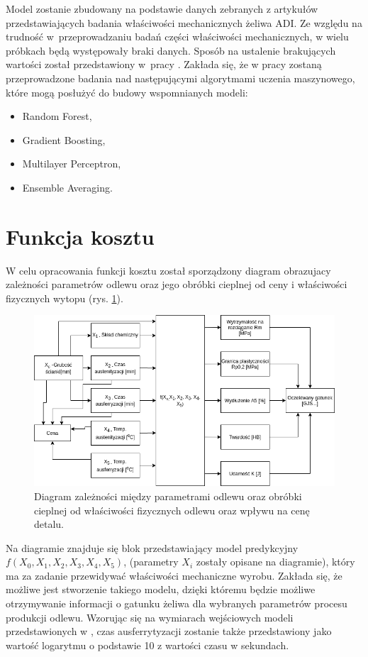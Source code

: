 Model zostanie zbudowany na podstawie danych zebranych z artykułów przedstawiających badania właściwości mechanicznych żeliwa ADI. Ze względu na trudność w~przeprowadzaniu badań części właściwości mechanicznych, w wielu próbkach będą występowały braki danych. Sposób na ustalenie brakujących wartości został przedstawiony w~pracy \cite{Kochanski12}. Zakłada się, że w pracy zostaną przeprowadzone badania nad następującymi algorytmami uczenia maszynowego, które mogą posłużyć do budowy wspomnianych modeli:
\begin{itemize}
    \item Random Forest,
    \item Gradient Boosting,
    \item Multilayer Perceptron,
    \item Ensemble Averaging.
\end{itemize}

\section{Funkcja kosztu}
W celu opracowania funkcji kosztu został sporządzony diagram obrazujacy zależności parametrów odlewu oraz jego obróbki cieplnej od ceny i właściwości fizycznych wytopu (rys. \ref{fig:parametry}). 
\begin{figure}[H]{}
	\centering
	\includegraphics[scale=0.45]{images/parametry_produkcji.png}
	\caption {
		 Diagram zależności między parametrami odlewu oraz obróbki cieplnej od właściwości fizycznych odlewu oraz wpływu na cenę detalu.
	}
	\label{fig:parametry}
\end{figure}

Na diagramie znajduje się blok przedstawiający model predykcyjny\linebreak$f(X_{0},X_{1},X_{2},X_{3},X_{4},X_{5})$, (parametry $X_{i}$ zostały opisane na diagramie), który ma za zadanie przewidywać właściwości mechaniczne wyrobu. Zakłada się, że możliwe jest stworzenie takiego modelu, dzięki któremu będzie możliwe otrzymywanie informacji o gatunku żeliwa dla wybranych parametrów procesu produkcji odlewu. Wzorując się na wymiarach wejściowych modeli przedstawionych w \cite{YESCAS2001162}, czas ausferrytyzacji zostanie także przedstawiony jako wartość logarytmu o podstawie 10 z wartości czasu w sekundach.

